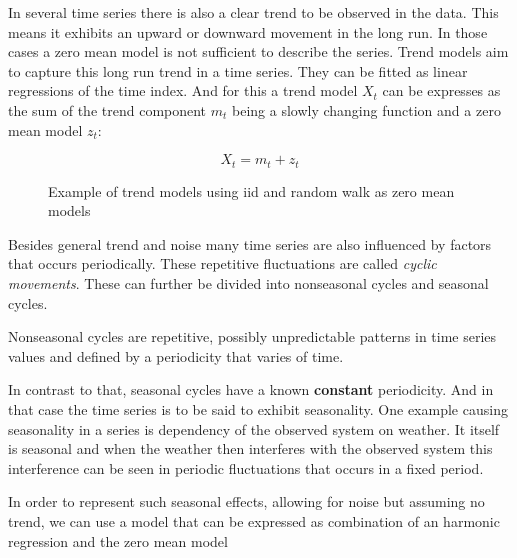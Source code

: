 In several time series there is also a clear trend to be observed in the data. This means it exhibits an upward or downward movement in the long run. In those cases a zero mean model is not sufficient to describe the series. 
Trend models aim to capture this long run trend in a time series. They can be fitted as linear regressions of the time index. And for this a trend model \(X_t\) can be expresses as the sum of the trend component \(m_t\) being a slowly changing function and a zero mean model \(z_t\):

\begin{equation}\label{eq:simple_trend_model}
	X_t = m_t + z_t
\end{equation}

\begin{figure}[ht]
	\centering
	\caption{Example of trend models using  \acs{iid} and random walk as zero mean models}
\end{figure}

Besides general trend and noise many time series are also influenced by factors that occurs periodically. These repetitive fluctuations are called \textit{cyclic movements}. These can further be divided into nonseasonal cycles and seasonal cycles.

Nonseasonal cycles are repetitive, possibly unpredictable patterns in time series values and defined by a periodicity that varies of time. 

In contrast to that, seasonal cycles have a known \textbf{constant} periodicity. And in that case the time series is to be said to exhibit seasonality.  One example causing seasonality in a series is dependency of the observed system on  weather. It itself is seasonal and when the weather then interferes with the observed system this interference can be seen in periodic fluctuations that occurs in a fixed period.

In order to represent such seasonal effects, allowing for noise but assuming no trend, we can use a model that can be expressed as combination of an harmonic regression and the zero mean model 

